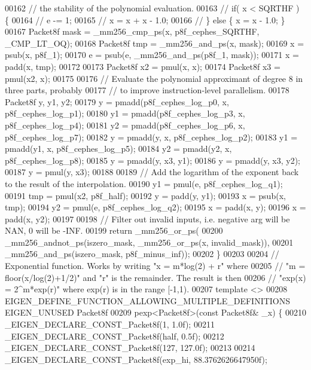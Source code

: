 \begin{DoxyCode}
00162   \textcolor{comment}{// the stability of the polynomial evaluation.}
00163   \textcolor{comment}{//   if( x < SQRTHF ) \{}
00164   \textcolor{comment}{//     e -= 1;}
00165   \textcolor{comment}{//     x = x + x - 1.0;}
00166   \textcolor{comment}{//   \} else \{ x = x - 1.0; \}}
00167   Packet8f mask = \_mm256\_cmp\_ps(x, p8f\_cephes\_SQRTHF, \_CMP\_LT\_OQ);
00168   Packet8f tmp = \_mm256\_and\_ps(x, mask);
00169   x = psub(x, p8f\_1);
00170   e = psub(e, \_mm256\_and\_ps(p8f\_1, mask));
00171   x = padd(x, tmp);
00172 
00173   Packet8f x2 = pmul(x, x);
00174   Packet8f x3 = pmul(x2, x);
00175 
00176   \textcolor{comment}{// Evaluate the polynomial approximant of degree 8 in three parts, probably}
00177   \textcolor{comment}{// to improve instruction-level parallelism.}
00178   Packet8f y, y1, y2;
00179   y = pmadd(p8f\_cephes\_log\_p0, x, p8f\_cephes\_log\_p1);
00180   y1 = pmadd(p8f\_cephes\_log\_p3, x, p8f\_cephes\_log\_p4);
00181   y2 = pmadd(p8f\_cephes\_log\_p6, x, p8f\_cephes\_log\_p7);
00182   y = pmadd(y, x, p8f\_cephes\_log\_p2);
00183   y1 = pmadd(y1, x, p8f\_cephes\_log\_p5);
00184   y2 = pmadd(y2, x, p8f\_cephes\_log\_p8);
00185   y = pmadd(y, x3, y1);
00186   y = pmadd(y, x3, y2);
00187   y = pmul(y, x3);
00188 
00189   \textcolor{comment}{// Add the logarithm of the exponent back to the result of the interpolation.}
00190   y1 = pmul(e, p8f\_cephes\_log\_q1);
00191   tmp = pmul(x2, p8f\_half);
00192   y = padd(y, y1);
00193   x = psub(x, tmp);
00194   y2 = pmul(e, p8f\_cephes\_log\_q2);
00195   x = padd(x, y);
00196   x = padd(x, y2);
00197 
00198   \textcolor{comment}{// Filter out invalid inputs, i.e. negative arg will be NAN, 0 will be -INF.}
00199   \textcolor{keywordflow}{return} \_mm256\_or\_ps(
00200       \_mm256\_andnot\_ps(iszero\_mask, \_mm256\_or\_ps(x, invalid\_mask)),
00201       \_mm256\_and\_ps(iszero\_mask, p8f\_minus\_inf));
00202 \}
00203 
00204 \textcolor{comment}{// Exponential function. Works by writing "x = m*log(2) + r" where}
00205 \textcolor{comment}{// "m = floor(x/log(2)+1/2)" and "r" is the remainder. The result is then}
00206 \textcolor{comment}{// "exp(x) = 2^m*exp(r)" where exp(r) is in the range [-1,1).}
00207 \textcolor{keyword}{template} <>
00208 EIGEN\_DEFINE\_FUNCTION\_ALLOWING\_MULTIPLE\_DEFINITIONS EIGEN\_UNUSED Packet8f
00209 pexp<Packet8f>(\textcolor{keyword}{const} Packet8f& \_x) \{
00210   \_EIGEN\_DECLARE\_CONST\_Packet8f(1, 1.0f);
00211   \_EIGEN\_DECLARE\_CONST\_Packet8f(half, 0.5f);
00212   \_EIGEN\_DECLARE\_CONST\_Packet8f(127, 127.0f);
00213 
00214   \_EIGEN\_DECLARE\_CONST\_Packet8f(exp\_hi, 88.3762626647950f);

\end{DoxyCode}
